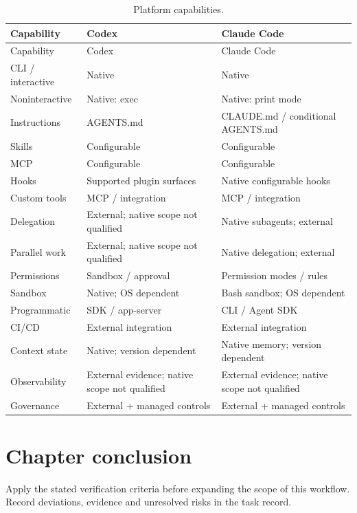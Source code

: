 \begin{longtable}{>{\RaggedRight\arraybackslash}p{.25\linewidth}>{\RaggedRight\arraybackslash}p{.33\linewidth}>{\RaggedRight\arraybackslash}p{.32\linewidth}}\caption{Platform capabilities.}\\\toprule Capability & Codex & Claude Code\\\midrule\endfirsthead\toprule Capability & Codex & Claude Code\\\midrule\endhead

CLI / interactive & Native & Native\\

Noninteractive & Native: exec & Native: print mode\\

Instructions & AGENTS.md & CLAUDE.md / conditional AGENTS.md\\

Skills & Configurable & Configurable\\

MCP & Configurable & Configurable\\

Hooks & Supported plugin surfaces & Native configurable hooks\\

Custom tools & MCP / integration & MCP / integration\\

Delegation & External; native scope not qualified & Native subagents; external\\

Parallel work & External; native scope not qualified & Native delegation; external\\

Permissions & Sandbox / approval & Permission modes / rules\\

Sandbox & Native; OS dependent & Bash sandbox; OS dependent\\

Programmatic & SDK / app-server & CLI / Agent SDK\\

CI/CD & External integration & External integration\\

Context state & Native; version dependent & Native memory; version dependent\\

Observability & External evidence; native scope not qualified & External evidence; native scope not qualified\\

Governance & External + managed controls & External + managed controls\\

\bottomrule\end{longtable}

\section{Chapter conclusion}

Apply the stated verification criteria before expanding the scope of this workflow. Record deviations, evidence and unresolved risks in the task record.
